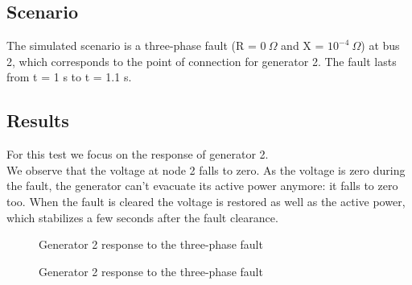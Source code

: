 \documentclass[a4paper, 12pt]{report}
\begin{document}
\subsection{Scenario}
The simulated scenario is a three-phase fault (R = $0 \ \Omega$ and X = $10^{-4} \ \Omega$) at bus 2, which corresponds to the point of connection for generator 2. The fault lasts from t = 1 s to t = 1.1 s.

\newpage
\subsection{Results}

For this test we focus on the response of generator 2.\\

We observe that the voltage at node 2 falls to zero. As the voltage is zero during the fault, the generator can't evacuate its active power anymore: it falls to zero too. When the fault is cleared the voltage is restored as well as the active power, which stabilizes a few seconds after the fault clearance.\\

\begin{figure}[H]
\caption{Generator 2 response to the three-phase fault}
\end{figure}

\begin{figure}[H]
\caption{Generator 2 response to the three-phase fault}
\end{figure}
\end{document}
